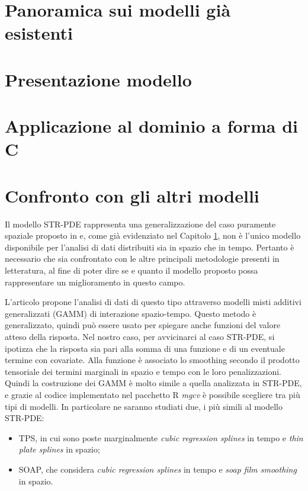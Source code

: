 \documentclass[a4paper,11pt,twoside,openright]{book}							%
\begin{document}
\chapter{Panoramica sui modelli già esistenti}
\label{cap:panoramica}

\chapter{Presentazione modello}
\label{cap:modello}

\chapter{Applicazione al dominio a forma di C}
\label{cap:domC}

\chapter{Confronto con gli altri modelli}
\label{cap:confronto}

Il modello STR-PDE rappresenta una generalizzazione del caso puramente spaziale proposto in \cite{art:sangalli} e, come già evidenziato nel Capitolo \ref{cap:panoramica}, non è l'unico modello disponibile per l'analisi di dati distribuiti sia in spazio che in tempo. Pertanto è necessario che sia confrontato con le altre principali metodologie presenti in letteratura, al fine di poter dire se e quanto il modello proposto possa rappresentare un miglioramento in questo campo.

L'articolo \cite{art:augustin} propone l'analisi di dati di questo tipo attraverso modelli misti additivi generalizzati (GAMM) di interazione spazio-tempo. Questo metodo è generalizzato, quindi può essere usato per spiegare anche funzioni del valore atteso della risposta. Nel nostro caso, per avvicinarci al caso STR-PDE, si ipotizza che la risposta sia pari alla somma di una funzione e di un eventuale termine con covariate. Alla funzione è associato lo smoothing secondo il prodotto tensoriale dei termini marginali in spazio e tempo con le loro penalizzazioni. Quindi la costruzione dei GAMM è molto simile a quella analizzata in STR-PDE, e grazie al codice implementato nel pacchetto R \textit{mgcv} è possibile scegliere tra più tipi di modelli. In particolare ne saranno studiati due, i più simili al modello STR-PDE:
\begin{itemize}
\item TPS, in cui sono poste marginalmente \textit{cubic regression splines} in tempo e \textit{thin plate splines} in spazio;
\item SOAP, che considera \textit{cubic regression splines} in tempo e \textit{soap film smoothing} in spazio.
\end{itemize}
\end{document}
